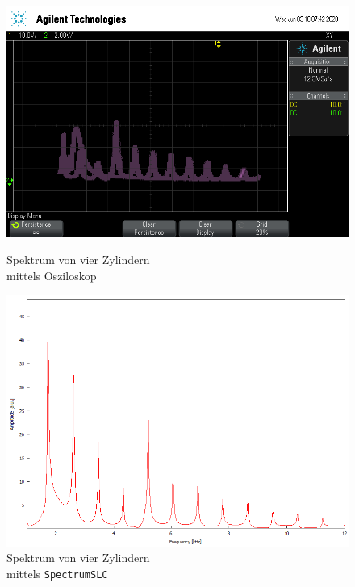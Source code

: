 \begin{figure}
    \begin{minipage}[b]{.4\linewidth} %
        \includegraphics[width=\linewidth]{figure/4Zylinder.png}
        \vspace*{0.008cm}
        \caption{Spektrum von vier Zylindern\\ mittels Osziloskop}
     \end{minipage}
     \hspace{.1\linewidth}%
     \begin{minipage}[b]{.4\linewidth} %
        \includegraphics[width=\linewidth]{figure/4_Zylinder.png}
        \caption{Spektrum von vier Zylindern\\ mittels \texttt{SpectrumSLC}}
     \end{minipage}
\end{figure}

